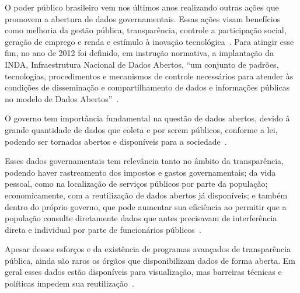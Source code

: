 O poder público brasileiro vem nos últimos anos realizando outras ações que promovem a abertura de dados governamentais. Essas ações visam benefícios como melhoria da gestão pública, transparência, controle a participação social, geração de emprego e renda e estímulo à inovação tecnológica~\cite{tcu}. Para atingir esse fim, no ano de 2012 foi definido, em instrução normativa, a implantação da INDA, Infraestrutura Nacional de Dados Abertos, \enquote{um conjunto de padrões, tecnologias, procedimentos e mecanismos de controle necessários para atender às condições de disseminação e compartilhamento de dados e informações públicas no modelo de Dados Abertos}~\cite{inda}.  

O governo tem importância fundamental na questão de dados abertos, devido â grande quantidade de dados que coleta e por serem públicos, conforme a lei, podendo ser tornados abertos e disponíveis para a sociedade~\cite{openknowledge}.

Esses dados governamentais tem relevância tanto no âmbito da transparência, podendo haver rastreamento dos impostos e gastos governamentais; da vida pessoal, como na localização de serviços públicos por parte da população; economicamente, com a reutilização de dados abertos já disponíveis; e também dentro do próprio governo, que pode aumentar sua eficiência ao permitir que a população consulte diretamente dados que antes precisavam de interferência direta e individual por parte de funcionários públicos~\cite{openknowledge}.

Apesar desses esforços e da existência de programas avançados de transparência pública, ainda são raros os órgãos que disponibilizam dados de forma aberta. Em geral esses dados estão disponíveis para visualização, mas barreiras técnicas e políticas impedem sua reutilização~\cite{w3cmanual}.








